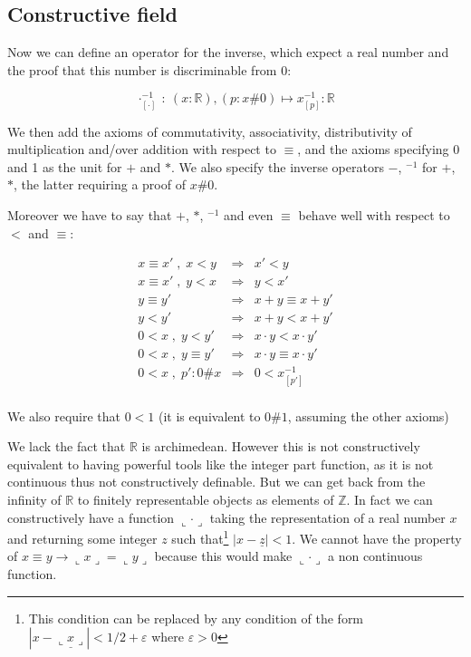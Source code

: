 \documentclass[a4paper,11pt]{article}
\newcommand{\R}{\mathbb{R}}
\newcommand{\Z}{\mathbb{Z}}
\theoremstyle{definition}
\theoremstyle{remark}
\begin{document}
\subsection{Constructive field}

  Now we can define an operator for the inverse, which expect a real number and the
  proof that this number is discriminable from 0:

  \[
    \cdot^{-1}_{[\cdot]} \ : \  (x:\R), (p:x\#0) \mapsto x^{-1}_{[p]} : \R
  \]

  We then add the axioms of commutativity, associativity, distributivity of multiplication and/over
  addition with respect to $≡$, and the axioms specifying 0 and 1 as the unit for $+$ and $*$. We also specify the inverse operators $-$, $^{-1}$ for $+$, $*$, the latter requiring a proof of $x\#0$.

  Moreover we have to say that $+$, $*$, $^{-1}$ and even $≡$ behave well with respect to $<$ and $≡$:

  \[
    \begin{array}{rcl}
      x ≡ x' \;,\; x < y   &  \Rightarrow  & x' < y \\
      x ≡ x' \;,\; y < x   &  \Rightarrow  & y < x' \\
      y ≡ y'               &  \Rightarrow  & x + y ≡ x + y' \\
      y < y'                    &  \Rightarrow  & x + y < x + y' \\
      0 < x \;,\; y < y'        &  \Rightarrow  & x \cdot y < x \cdot y' \\
      0 < x \;,\; y ≡ y'   &  \Rightarrow  & x \cdot y ≡ x \cdot y' \\
      0<x \;,\;  p':0\#x      &  \Rightarrow  & 0 < x^{-1}_{[p']} \\
    \end{array}
  \]

  We also require that $0<1$ (it is equivalent to $0\#1$, assuming the other axioms)

  We lack the fact that $\R$ is archimedean. However this is not constructively equivalent to having powerful tools like the integer part function, as it is not continuous thus not constructively definable. But we can get back from the infinity of $\R$ to finitely representable objects as elements of $\Z$. In fact we can constructively have a function $\llcorner \cdot \lrcorner$ taking the representation of a real number $x$ and returning some integer $z$ such that\footnote{This condition can be replaced by any condition of the form $| x-\underline {\llcorner x \lrcorner} | < 1/2+\varepsilon$ where $\varepsilon>0$} $| x-\underline z | < 1$. We cannot have the property of $x≡y → \llcorner x \lrcorner=\llcorner y \lrcorner$ because this would make $\llcorner \cdot \lrcorner$ a non continuous function.
\end{document}
